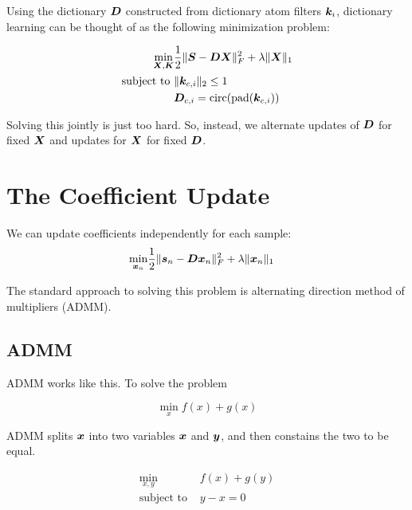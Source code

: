 \documentclass{article}
\begin{document}
Using the dictionary $\bm{D}$ constructed from dictionary atom filters $\bm{k}_i$, dictionary learning can be thought of as the following minimization problem:

\begin{equation}
\begin{aligned}
\min_{\bm{X},\bm{K}} & \frac{1}{2}\|\bm{S} - \bm{D}\bm{X}\|_F^2 + \lambda\|\bm{X}\|_1\\
\text{subject to } & \|\bm{k}_{c,i}\|_2 \leq 1\\
                   & \bm{D}_{c,i} = \operatorname{circ}(\operatorname{pad}(\bm{k}_{c,i}))
\end{aligned}
\end{equation}

Solving this jointly is just too hard. So, instead, we alternate updates of $\bm{D}$ for fixed $\bm{X}$ and updates for $\bm{X}$ for fixed $\bm{D}$.

\section{The Coefficient Update}

We can update coefficients independently for each sample:
\begin{equation}
\begin{aligned}
\min_{\bm{x}_n} & \frac{1}{2}\|\bm{s}_n - \bm{D}\bm{x}_n\|_F^2 + \lambda\|\bm{x}_n\|_1
\end{aligned}
\end{equation}

The standard approach to solving this problem is alternating direction method of multipliers (ADMM).

\subsection{ADMM}

ADMM works like this. To solve the problem

\begin{equation}
\min_x f(x) + g(x)
\end{equation}

ADMM splits $\bm{x}$ into two variables $\bm{x}$ and $\bm{y}$, and then constains the two to be equal.

\begin{equation}
\begin{aligned}
\min_{x,y} & f(x) + g(y) \\
\text{subject to } & y - x = 0
\end{aligned}
\end{equation}
\end{document}

